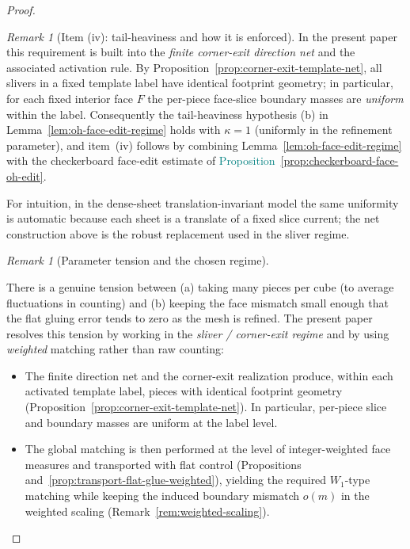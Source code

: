 \documentclass[11pt]{article}
\newcommand{\REVMZ}[1]{\textcolor{teal}{#1}}  %
\numberwithin{equation}{section}  %
\theoremstyle{plain}
\theoremstyle{definition}
\theoremstyle{remark}
\newtheorem{remark}[theorem]{Remark}
\begin{document}
\begin{proof}
\begin{remark}[Item \textnormal{(iv)}: tail-heaviness and how it is enforced]
In the present paper this requirement is built into the \emph{finite corner-exit direction net} and the associated activation rule.
By Proposition~\ref{prop:corner-exit-template-net}, all slivers in a fixed template label have identical footprint geometry; in particular, for each fixed interior face $F$ the per-piece face-slice boundary masses are \emph{uniform} within the label.
Consequently the tail-heaviness hypothesis \textnormal{(b)} in Lemma~\ref{lem:oh-face-edit-regime} holds with $\kappa=1$ (uniformly in the refinement parameter), and item~\textnormal{(iv)} follows by combining Lemma~\ref{lem:oh-face-edit-regime} with the checkerboard face-edit estimate of \REVMZ{Proposition~\ref{prop:checkerboard-face-oh-edit}}.


\smallskip
For intuition, in the dense-sheet translation-invariant model the same uniformity is automatic because each sheet is a translate of a fixed slice current; the net construction above is the robust replacement used in the sliver regime.
\end{remark}


\begin{remark}[Parameter tension and the chosen regime]\label{rem:param-tension}

There is a genuine tension between (a) taking many pieces per cube (to average fluctuations in counting) and (b) keeping the face mismatch small enough that the flat gluing error tends to zero as the mesh is refined.
The present paper resolves this tension by working in the \emph{sliver / corner-exit regime} and by using \emph{weighted} matching rather than raw counting:

\begin{itemize}
\item The finite direction net and the corner-exit realization produce, within each activated template label, pieces with identical footprint geometry (Proposition~\ref{prop:corner-exit-template-net}). In particular, per-piece slice and boundary masses are uniform at the label level.
\item The global matching is then performed at the level of integer-weighted face measures and transported with flat control (Propositions and~\ref{prop:transport-flat-glue-weighted}), yielding the required $W_1$-type matching while keeping the induced boundary mismatch $o(m)$ in the weighted scaling (Remark~\ref{rem:weighted-scaling}).
\end{itemize}


\end{remark}
\end{proof}
\end{document}
